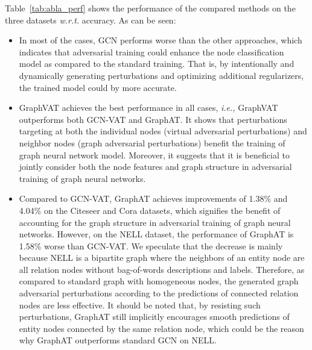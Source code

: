 \documentclass[10pt,journal,compsoc]{IEEEtran}
\newcommand{\ie}{\emph{i.e., }}
\newcommand{\wrt}{\emph{w.r.t. }}
\begin{document}
Table~\ref{tab:abla_perf} shows the performance of the compared methods on the three datasets \wrt accuracy. As can be seen:
\begin{itemize}[leftmargin=*]
	\item In most of the cases, GCN performs worse than the other approaches, which indicates that adversarial training could enhance the node classification model as compared to the standard training. That is, by intentionally and dynamically generating perturbations and optimizing additional regularizers, the trained model could by more accurate.

	\item GraphVAT achieves the best performance in all cases, \ie GraphVAT outperforms both GCN-VAT and GraphAT. It shows that perturbations targeting at both the individual nodes (virtual adversarial perturbations) and neighbor nodes (graph adversarial perturbations) benefit the training of graph neural network model. Moreover, it suggests that it is beneficial to jointly consider both the node features and graph structure in adversarial training of graph neural networks.
	
	\item Compared to GCN-VAT, GraphAT achieves improvements of 1.38\% and 4.04\% on the Citeseer and Cora datasets, which signifies the benefit of accounting for the graph structure in adversarial training of graph neural networks. However, on the NELL dataset, the performance of GraphAT is 1.58\% worse than GCN-VAT. We speculate that the decrease is mainly because NELL is a bipartite graph where the neighbors of an entity node are all relation nodes without bag-of-words descriptions and labels. Therefore, as compared to standard graph with homogeneous nodes, the generated graph adversarial perturbations according to the predictions of connected relation nodes are less effective. It should be noted that, by resisting such perturbations, GraphAT still implicitly encourages smooth predictions of entity nodes connected by the same relation node, which could be the reason why GraphAT outperforms standard GCN on NELL.
\end{itemize}
\end{document}
